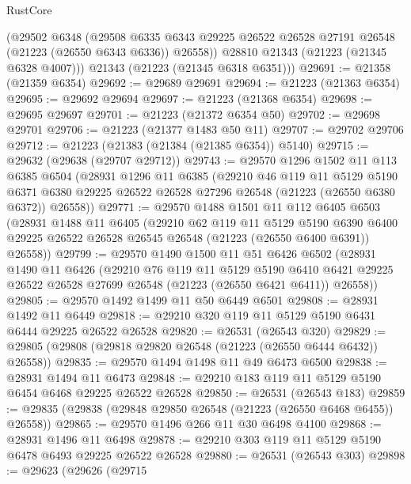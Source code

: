 \begin{lexlean}{RustCore}
\begin{coremodule}
        (@29502
          @6348
          (@29508
            @6335
            @6343
            @29225
            @26522
            @26528
            @27191
            @26548
            (@21223 (@26550 @6343 @6336))
            @26558))
        @28810
        @21343
        (@21223 (@21345 @6328 @4007)))
      @21343
      (@21223 (@21345 @6318 @6351)))
@29691 := @21358 (@21359 @6354)
@29692 := @29689 @29691
@29694 := @21223 (@21363 @6354)
@29695 := @29692 @29694
@29697 := @21223 (@21368 @6354)
@29698 := @29695 @29697
@29701 := @21223 (@21372 @6354 @50)
@29702 := @29698 @29701
@29706 := @21223 (@21377 @1483 @50 @11)
@29707 := @29702 @29706
@29712 := @21223 (@21383 (@21384 (@21385 @6354)) @5140)
@29715 := @29632 (@29638 (@29707 @29712))
@29743 := @29570
    @1296
    @1502
    @11
    @113
    @6385
    @6504
    (@28931
      @1296
      @11
      @6385
      (@29210
        @46
        @119
        @11
        @5129
        @5190
        @6371
        @6380
        @29225
        @26522
        @26528
        @27296
        @26548
        (@21223 (@26550 @6380 @6372))
        @26558))
@29771 := @29570
    @1488
    @1501
    @11
    @112
    @6405
    @6503
    (@28931
      @1488
      @11
      @6405
      (@29210
        @62
        @119
        @11
        @5129
        @5190
        @6390
        @6400
        @29225
        @26522
        @26528
        @26545
        @26548
        (@21223 (@26550 @6400 @6391))
        @26558))
@29799 := @29570
    @1490
    @1500
    @11
    @51
    @6426
    @6502
    (@28931
      @1490
      @11
      @6426
      (@29210
        @76
        @119
        @11
        @5129
        @5190
        @6410
        @6421
        @29225
        @26522
        @26528
        @27699
        @26548
        (@21223 (@26550 @6421 @6411))
        @26558))
@29805 := @29570 @1492 @1499 @11 @50 @6449 @6501
@29808 := @28931 @1492 @11 @6449
@29818 := @29210 @320 @119 @11 @5129 @5190 @6431 @6444 @29225 @26522 @26528
@29820 := @26531 (@26543 @320)
@29829 := @29805 (@29808 (@29818 @29820 @26548 (@21223 (@26550 @6444 @6432)) @26558))
@29835 := @29570 @1494 @1498 @11 @49 @6473 @6500
@29838 := @28931 @1494 @11 @6473
@29848 := @29210 @183 @119 @11 @5129 @5190 @6454 @6468 @29225 @26522 @26528
@29850 := @26531 (@26543 @183)
@29859 := @29835 (@29838 (@29848 @29850 @26548 (@21223 (@26550 @6468 @6455)) @26558))
@29865 := @29570 @1496 @266 @11 @30 @6498 @4100
@29868 := @28931 @1496 @11 @6498
@29878 := @29210 @303 @119 @11 @5129 @5190 @6478 @6493 @29225 @26522 @26528
@29880 := @26531 (@26543 @303)
@29898 := @29623
    (@29626
      (@29715

\end{coremodule}
\end{lexlean}
